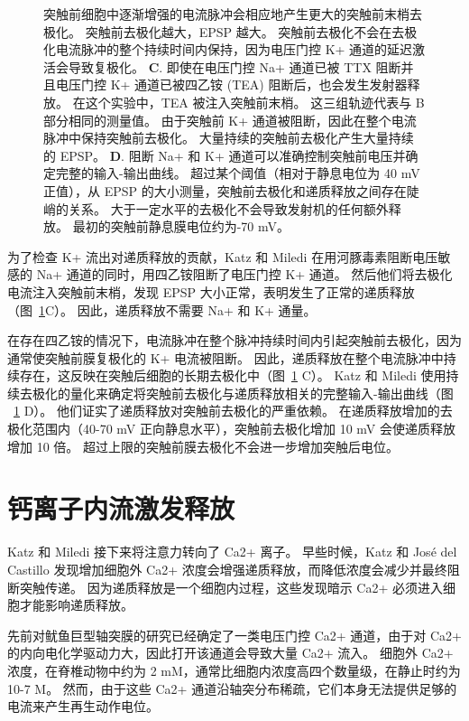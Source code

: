\begin{figure}[htbp]
{	突触前细胞中逐渐增强的电流脉冲会相应地产生更大的突触前末梢去极化。
	突触前去极化越大，EPSP 越大。
	突触前去极化不会在去极化电流脉冲的整个持续时间内保持，因为电压门控 K+ 通道的延迟激活会导致复极化。
	\textbf{C}. 即使在电压门控 Na+ 通道已被 TTX 阻断并且电压门控 K+ 通道已被四乙铵 (TEA) 阻断后，也会发生发射器释放。
	在这个实验中，TEA 被注入突触前末梢。
	这三组轨迹代表与 B 部分相同的测量值。
	由于突触前 K+ 通道被阻断，因此在整个电流脉冲中保持突触前去极化。
	大量持续的突触前去极化产生大量持续的 EPSP。
	\textbf{D}. 阻断 Na+ 和 K+ 通道可以准确控制突触前电压并确定完整的输入-输出曲线。 超过某个阈值（相对于静息电位为 40 mV 正值），从 EPSP 的大小测量，突触前去极化和递质释放之间存在陡峭的关系。
	大于一定水平的去极化不会导致发射机的任何额外释放。
	最初的突触前静息膜电位约为-70 mV。}
	\label{fig:15_2}
\end{figure}


为了检查 K+ 流出对递质释放的贡献，Katz 和 Miledi 在用河豚毒素阻断电压敏感的 Na+ 通道的同时，用四乙铵阻断了电压门控 K+ 通道。
然后他们将去极化电流注入突触前末梢，发现 EPSP 大小正常，表明发生了正常的递质释放（图~\ref{fig:15_2}C）。
因此，递质释放不需要 Na+ 和 K+ 通量。


在存在四乙铵的情况下，电流脉冲在整个脉冲持续时间内引起突触前去极化，因为通常使突触前膜复极化的 K+ 电流被阻断。
因此，递质释放在整个电流脉冲中持续存在，这反映在突触后细胞的长期去极化中（图~\ref{fig:15_2} C）。
Katz 和 Miledi 使用持续去极化的量化来确定将突触前去极化与递质释放相关的完整输入-输出曲线（图 ~\ref{fig:15_2} D）。
他们证实了递质释放对突触前去极化的严重依赖。 在递质释放增加的去极化范围内（40-70 mV 正向静息水平），突触前去极化增加 10 mV 会使递质释放增加 10 倍。
超过上限的突触前膜去极化不会进一步增加突触后电位。



\section{钙离子内流激发释放}

Katz 和 Miledi 接下来将注意力转向了 Ca2+ 离子。
早些时候，Katz 和 José del Castillo 发现增加细胞外 Ca2+ 浓度会增强递质释放，而降低浓度会减少并最终阻断突触传递。
因为递质释放是一个细胞内过程，这些发现暗示 Ca2+ 必须进入细胞才能影响递质释放。


先前对鱿鱼巨型轴突膜的研究已经确定了一类电压门控 Ca2+ 通道，由于对 Ca2+ 的内向电化学驱动力大，因此打开该通道会导致大量 Ca2+ 流入。
细胞外 Ca2+ 浓度，在脊椎动物中约为 2 mM，通常比细胞内浓度高四个数量级，在静止时约为 10-7 M。
然而，由于这些 Ca2+ 通道沿轴突分布稀疏，它们本身无法提供足够的电流来产生再生动作电位。


